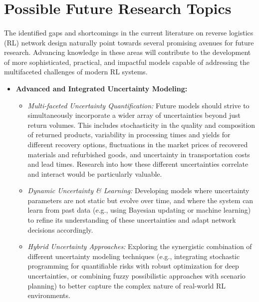 \section{Possible Future Research Topics}

\paragraph{} The identified gaps and shortcomings in the current literature on reverse logistics (RL) network design naturally point towards several promising avenues for future research. Advancing knowledge in these areas will contribute to the development of more sophisticated, practical, and impactful models capable of addressing the multifaceted challenges of modern RL systems.

\begin{itemize}
    \item \textbf{Advanced and Integrated Uncertainty Modeling:}
        \begin{itemize}
            \item \textit{Multi-faceted Uncertainty Quantification:} Future models should strive to simultaneously incorporate a wider array of uncertainties beyond just return volumes. This includes stochasticity in the quality and composition of returned products, variability in processing times and yields for different recovery options, fluctuations in the market prices of recovered materials and refurbished goods, and uncertainty in transportation costs and lead times. Research into how these different uncertainties correlate and interact would be particularly valuable.
            \item \textit{Dynamic Uncertainty \& Learning:} Developing models where uncertainty parameters are not static but evolve over time, and where the system can learn from past data (e.g., using Bayesian updating or machine learning) to refine its understanding of these uncertainties and adapt network decisions accordingly.
            \item \textit{Hybrid Uncertainty Approaches:} Exploring the synergistic combination of different uncertainty modeling techniques (e.g., integrating stochastic programming for quantifiable risks with robust optimization for deep uncertainties, or combining fuzzy possibilistic approaches with scenario planning) to better capture the complex nature of real-world RL environments.
        \end{itemize}


\end{itemize}
